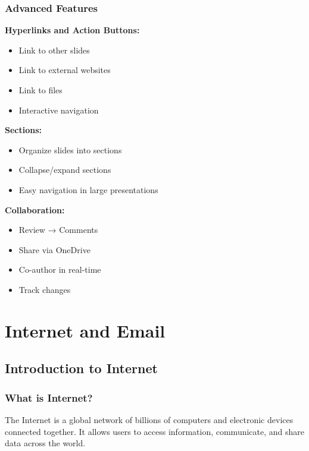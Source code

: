 \documentclass[12pt,a4paper]{article}
\begin{document}
\subsubsection{Advanced Features}

\textbf{Hyperlinks and Action Buttons:}
\begin{itemize}
    \item Link to other slides
    \item Link to external websites
    \item Link to files
    \item Interactive navigation
\end{itemize}

\textbf{Sections:}
\begin{itemize}
    \item Organize slides into sections
    \item Collapse/expand sections
    \item Easy navigation in large presentations
\end{itemize}

\textbf{Collaboration:}
\begin{itemize}
    \item Review → Comments
    \item Share via OneDrive
    \item Co-author in real-time
    \item Track changes
\end{itemize}

\newpage


\section{Internet and Email}

\subsection{Introduction to Internet}

\subsubsection{What is Internet?}
The Internet is a global network of billions of computers and electronic devices connected together. It allows users to access information, communicate, and share data across the world.
\end{document}
